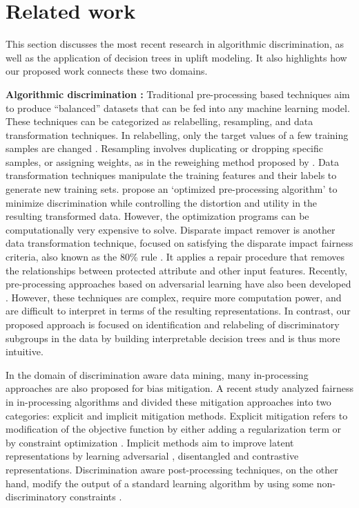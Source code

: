 \section{Related work}
This section discusses the most recent research in algorithmic discrimination, as well as the application of decision trees in uplift modeling. It also highlights how our proposed work connects these two domains. 

\textbf{Algorithmic discrimination :} 
\label{lit-review-disc}
Traditional pre-processing based techniques aim to produce “balanced” datasets that can be fed into any machine learning model. These techniques can be categorized as relabelling, resampling, and data transformation techniques. In relabelling, only the target values of a few training samples are changed \citep{kamiran2009classifying, luong2011k}. Resampling involves duplicating or dropping specific samples, or assigning weights, as in the reweighing method proposed by \citet{kamiran2012data}. Data transformation techniques manipulate the training features and their labels to generate new training sets. \citet{calmon2017optimized} propose an `optimized pre-processing algorithm' to minimize discrimination while controlling the distortion and utility in the resulting transformed data. However, the optimization programs can be computationally very expensive to solve. Disparate impact remover \citep{feldman2015certifying} is another data transformation technique, focused on satisfying the disparate impact fairness criteria, also known as the 80\% rule \citep{usgovernment2011}. It applies a repair procedure that removes the relationships between protected attribute and other input features. Recently, pre-processing approaches based on adversarial learning have also been developed \citep{madras2018learning}. However, these techniques are complex, require more computation power, and are difficult to interpret in terms of the resulting representations. In contrast, our proposed approach is focused on identification and relabeling of discriminatory subgroups in the data by building interpretable decision trees and is thus more intuitive.

In the domain of discrimination aware data mining, many in-processing approaches are also proposed for bias mitigation. A recent study analyzed fairness in in-processing algorithms \citep{wan2023processing} and divided these mitigation approaches into two categories: explicit and implicit mitigation methods. Explicit mitigation refers to modification of the objective function by either adding a regularization term \cite{jiang2020wasserstein, aghaei2019learning, agarwal2019fair} or by constraint optimization \citep{Saxena2024, garcia2021maxmin, lahoti2020fairness, garg2019counterfactual}. Implicit methods aim to improve latent representations by learning adversarial \citep{sweeney2020reducing, zhang2018mitigating}, disentangled \citep{kim2021counterfactual, park2021learning} and contrastive \citep{cheng2020fairfil, zhou2021contrastive} representations. Discrimination aware post-processing techniques, on the other hand, modify the output of a standard learning algorithm by using some non-discriminatory constraints \citep{kamiran2012icdm, hardt2016equality, Lohia2019, awasthi2020equalized}.

